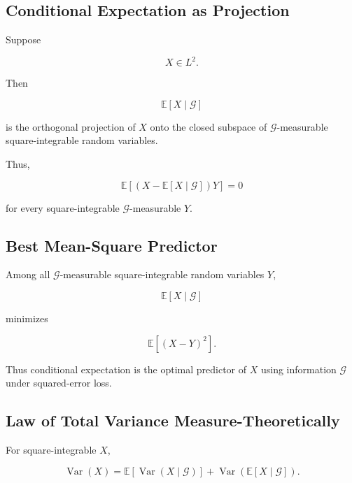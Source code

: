 \subsection{Conditional Expectation as Projection}
\label{subsec:conditional-expectation-projection}

Suppose

\[
X\in L^2.
\]

Then

\[
\mathbb{E}[X\mid\mathcal{G}]
\]

is the orthogonal projection of \(X\) onto the closed subspace of
\(\mathcal{G}\)-measurable square-integrable random variables.

Thus,

\[
\boxed{
\mathbb{E}
\left[
(X-\mathbb{E}[X\mid\mathcal{G}])Y
\right]
=
0
}
\]

for every square-integrable \(\mathcal{G}\)-measurable \(Y\).

\subsection{Best Mean-Square Predictor}
\label{subsec:best-mean-square-predictor}

Among all \(\mathcal{G}\)-measurable square-integrable random variables
\(Y\),

\[
\boxed{
\mathbb{E}[X\mid\mathcal{G}]
}
\]

minimizes

\[
\mathbb{E}[(X-Y)^2].
\]

Thus conditional expectation is the optimal predictor of \(X\) using
information \(\mathcal{G}\) under squared-error loss.

\subsection{Law of Total Variance Measure-Theoretically}
\label{subsec:total-variance-measure}

For square-integrable \(X\),

\[
\boxed{
\operatorname{Var}(X)
=
\mathbb{E}
[
\operatorname{Var}(X\mid\mathcal{G})
]
+
\operatorname{Var}
(
\mathbb{E}[X\mid\mathcal{G}]
).
}
\]

